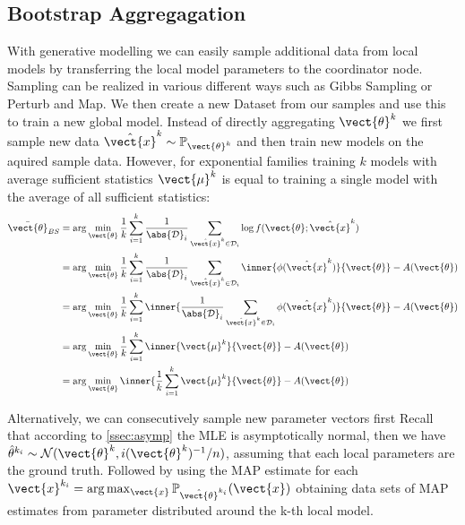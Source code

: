 \subsection{Bootstrap Aggregagation}

With generative modelling we can easily sample additional data from local models by transferring the local model parameters to the coordinator node.
Sampling can be realized in various different ways such as Gibbs Sampling or Perturb and Map.
We then create a new Dataset from our samples and use this to train a new global model. 
Instead of directly aggregating $\vect{\theta}^k$ we first sample new data  $\hat{\vect{x}}^k \sim \mathbb{P}_{\vect{\theta}^k}$ and then train new models on the aquired sample data.
However, for exponential families training $k$ models with average sufficient statistics $\vect{\mu}^k$ is equal to training a single model with the average of all sufficient statistics:
\begin{equation}
    \begin{split}
        \bar{\vect{\theta}}_{BS} &= \arg\min_{\vect{\theta}} \frac{1}{k}\sum_{i=1}^k \frac{1}{\abs{\mathcal{D}}_i} \sum_{\hat{\vect{x}}^k \in \mathcal{D}_i} \log f(\vect{\theta}; \hat{\vect{x}}^k) \\
        &=  \arg\min_{\vect{\theta}} \frac{1}{k}\sum_{i=1}^k \frac{1}{\abs{\mathcal{D}}_i} \sum_{\hat{\vect{x}}^k \in \mathcal{D}_i} \inner{\phi(\hat{\vect{x}}^k)}{\vect{\theta}} - A(\vect{\theta}) \\
        &= \arg\min_{\vect{\theta}} \frac{1}{k}\sum_{i=1}^k \inner{\frac{1}{\abs{\mathcal{D}}_i} \sum_{\hat{\vect{x}}^k \in \mathcal{D}_i} \phi(\hat{\vect{x}}^k)}{\vect{\theta}} - A(\vect{\theta}) \\
        &= \arg\min_{\vect{\theta}} \frac{1}{k}\sum_{i=1}^k \inner{\vect{\mu}^k}{\vect{\theta}} - A(\vect{\theta}) \\
        & =  \arg\min_{\vect{\theta}} \inner{\frac{1}{k}\sum_{i=1}^k  \vect{\mu}^k}{\vect{\theta}} - A(\vect{\theta})
    \end{split}
\end{equation}

Alternatively, we can consecutively sample new parameter vectors first
Recall that according to \ref{ssec:asymp} the MLE is asymptotically normal, then we have $\hat{\theta}^{k_i}  \sim \mathcal{N}(\vect{\theta}^k, i(\vect{\theta}^k)^{-1}/n)$, assuming that each local parameters are the ground truth.
Followed by using the MAP estimate for each $\vect{x}^{k_i} = \arg\max_{\vect{x}} \mathbb{P}_{\hat{\vect{\theta}}^{k_i}}(\vect{x})$ obtaining data sets of MAP estimates from parameter distributed around the k-th local model.


